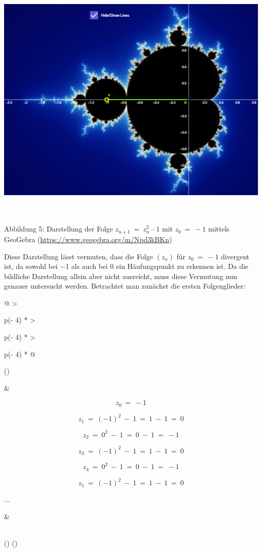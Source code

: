 \documentclass[a4paper, 12pt]{book}
\begin{document}
\includegraphics[width=6.33858in,height=4.74871in]{image10.png}

\protect\hypertarget{_Toc167901655}{}{}Abbildung 5: Darstellung der
Folge \(z_{n + 1}\  = \ z_{n}^{2}\ –\ 1\) mit \(z_{0}\  = \  - 1\)
mittels GeoGebra (\url{https://www.geogebra.org/m/Npd3kBKn})

Diese Darstellung lässt vermuten, dass die Folge
\(\left( z_{n} \right)\) für \(z_{0}\  = \  - 1\) divergent ist, da
sowohl bei \(-\)1 als auch bei 0 ein Häufungspunkt zu erkennen ist. Da
die bildliche Darstellung allein aber nicht ausreicht, muss diese
Vermutung nun genauer untersucht werden. Betrachtet man zunächst die
ersten Folgenglieder:

\begin{longtable}[]{@{}
  >{\raggedright\arraybackslash}p{(\columnwidth - 4\tabcolsep) * }
  >{\raggedright\arraybackslash}p{(\columnwidth - 4\tabcolsep) * }
  >{\raggedright\arraybackslash}p{(\columnwidth - 4\tabcolsep) * }@{}}
\toprule()
\begin{minipage}[b]{\linewidth}\raggedright
\end{minipage} & \begin{minipage}[b]{\linewidth}\raggedright
\[z_{0}\  = \  - 1\]

\[z_{1}\  = \ ( - 1)^{2}\  - \ 1\  = \ 1\  - \ 1\  = \ 0\]

\[z_{2}\  = \ 0^{2}\  - \ 1\  = \ 0\  - \ 1\  = \  - 1\]

\[z_{3}\  = \ ( - 1)^{2}\  - \ 1\  = \ 1\  - \ 1\  = \ 0\]

\[z_{4}\  = \ 0^{2}\  - \ 1\  = \ 0\  - \ 1\  = \  - 1\]

\[z_{5}\  = \ ( - 1)^{2}\  - \ 1\  = \ 1\  - \ 1\  = \ 0\]

...
\end{minipage} & \begin{minipage}[b]{\linewidth}\raggedright
\end{minipage} \\
\midrule()
\endhead
\bottomrule()
\end{longtable}
\end{document}
